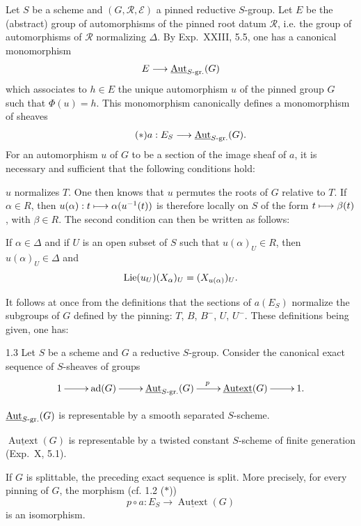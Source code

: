 \label{XXIV.1.2}
Let $S$ be a scheme and $(G,\mathscr R,\mathscr E)$ a pinned reductive $S$-group. Let $E$ be the (abstract) group of automorphisms of the pinned root datum $\mathscr R$, i.e. the group of automorphisms of $\mathscr R$ normalizing $\Delta$. By Exp.~XXIII, 5.5, one has a canonical monomorphism
\[
E\longrightarrow\underline{\operatorname{Aut}}_{S\text{-gr.}}(G)
\]
which associates to $h\in E$ the unique automorphism $u$ of the pinned group $G$ such that $\Phi(u)=h$. This monomorphism canonically defines a monomorphism of sheaves
\begin{equation}\tag{$*$}
a:E_S\longrightarrow\underline{\operatorname{Aut}}_{S\text{-gr.}}(G).
\end{equation}
For an automorphism $u$ of $G$ to be a section of the image sheaf of $a$, it is necessary and sufficient that the following conditions hold:
\begin{enumeratei}
\item $u$ normalizes $T$. One then knows that $u$ permutes the roots of $G$ relative to $T$. If $\alpha\in R$, then $u(\alpha):t\longmapsto\alpha(u^{-1}(t))$ is therefore locally on $S$ of the form $t\longmapsto\beta(t)$, with $\beta\in R$. The second condition can then be written as follows:
\item If $\alpha\in\Delta$ and if $U$ is an open subset of $S$ such that $u(\alpha)_U\in R$, then $u(\alpha)_U\in\Delta$ and
\[
\operatorname{Lie}(u_U)(X_\alpha)_U=(X_{u(\alpha)})_U.
\]
\end{enumeratei}
It follows at once from the definitions that the sections of $a(E_S)$ normalize the subgroups of $G$ defined by the pinning: $T$, $B$, $B^-$, $U$, $U^-$. These definitions being given, one has:

\begin{theorem}{1.3}\label{XXIV.1.3}
Let $S$ be a scheme and $G$ a reductive $S$-group. Consider the canonical exact sequence of $S$-sheaves of groups
\[
\xymatrix{1\ar[r]&\ad(G)\ar[r]&\underline{\Aut}_{S\text{-gr.}}(G)\ar[r]^p&\underline{\operatorname{Autext}}(G)\ar[r]&1.}
\]
\begin{enumeratei}
\item $\underline{\operatorname{Aut}}_{S\text{-gr.}}(G)$ is representable by a smooth separated $S$-scheme.
\item $\underline{\operatorname{Autext}}(G)$ is representable by a twisted constant $S$-scheme of finite generation (Exp.~X, 5.1).
\item If $G$ is splittable, the preceding exact sequence is split. More precisely, for every pinning of $G$, the morphism (cf. 1.2 ($*$))
\[
p\circ a:E_S\to\underline{\operatorname{Autext}}(G)
\]
is an isomorphism.
\end{enumeratei}
\end{theorem}


